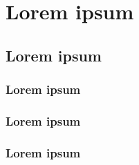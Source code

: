 \chapter{Lorem ipsum}
        \section{Lorem ipsum}
                \subsection{Lorem ipsum}
                \subsection{Lorem ipsum}
                \subsection{Lorem ipsum}
                        \lipsum[1-1]
